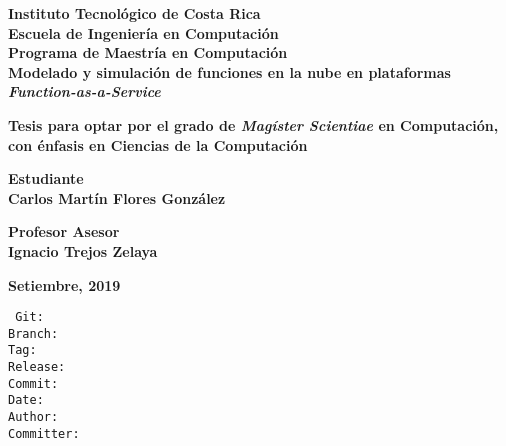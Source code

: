 \documentclass[12pt, twoside]{report}
\begin{document}
\thispagestyle{plain}
\begin{titlepage}
	\begin{center}
        {\fontsize{24}{28}\selectfont \textbf{Instituto Tecnológico de Costa Rica}\\}
        \vspace{1cm}
        {\fontsize{20}{24}\selectfont \textbf{Escuela de Ingeniería en Computación}\\}
        {\fontsize{18}{22}\selectfont \textbf{Programa de Maestría en Computación}\\}
        \vspace{2cm}
        {\fontsize{20}{24}\selectfont \textbf{Modelado y simulación de funciones en la nube en plataformas \textit{Function-as-a-Service}}}    
    
    
        \vspace{2cm}
        {\fontsize{14}{17}\selectfont \textbf{Tesis para optar por el grado de \emph{Magíster Scientiae} en Computación, con énfasis en Ciencias de la Computación
}}
        
       \vspace{1.5cm}
       {\fontsize{14}{17}\selectfont \textbf{Estudiante\\ Carlos Martín Flores González}} 
       
       \vspace{1cm}
       {\fontsize{14}{17}\selectfont \textbf{Profesor Asesor\\ Ignacio Trejos Zelaya}}
       
       \vspace{1.5cm}
       {\fontsize{14}{17}\selectfont \textbf{Setiembre, 2019}}                       
        
    \end{center}
\end{titlepage}

{} 
\renewcommand*\contentsname{Índice}

\renewcommand{\listtablename}{Lista de Tablas}


\newpage
{\footnotesize
\noindent
\texttt{
Git: \gitReferences \\
Branch: \gitBranch \\
Tag: \gitVtag \\
Release: \gitReln{} \\
Commit: \gitAbbrevHash \\
Date: \gitAuthorIsoDate \\
Author: \gitAuthorName\\
Committer: \gitCommitterName
}}
\newpage




\end{document}
